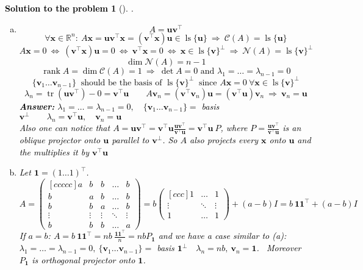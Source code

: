 \documentclass[12pt,a4]{article}
\newtheorem{solution}{Solution to the problem}
\newcommand\rank{\operatorname{rank}}
\newcommand\trace{\operatorname{tr}}
\newcommand\ls{\operatorname{ls}}
\newcommand{\bR}{{\mathbb R}}
\newcommand{\bu}{{\mathbf u}}
\newcommand{\bv}{{\mathbf v}}
\newcommand{\bx}{{\mathbf x}}
\newcommand{\one}{{\mathbf 1}}
\renewcommand{\Im}{{\mathcal C}}
\newcommand{\Ker}{{\mathcal N}}
\newcommand{\answer}[1]{\textbf{Answer:} #1}
\begin{document}
\textcolor{black}{
\begin{solution}[]\rm .
\begin{enumerate}[(a)]
\item
\[
A = \bu \bv^\top
\]
\[
\forall \bx \in \bR^n: ~
A\bx = \bu \bv^\top \bx = (\bv^\top \bx) \bu \in \ls \{\bu\} 
~ \Rightarrow ~
\Im(A) = \ls \{\bu\} 
\]
\[
A\bx = 0
~ \Leftrightarrow ~
(\bv^\top \bx) \bu = 0
~ \Leftrightarrow ~
\bv^\top \bx = 0 
~ \Leftrightarrow ~
\bx \in \ls\{\bv\}^\perp
~ \Rightarrow ~
\Ker(A) = \ls\{\bv\}^\perp
\]
\[
\dim \Ker(A) = n - 1 
\]
\[
\rank A = \dim \Im(A) = 1
~ \Rightarrow ~
\det A = 0
\text{ and }
\lambda_1 = \dots = \lambda_{n-1} = 0
\]
\[
\{\bv_1 \dots \bv_{n-1}\} ~\text{ should be the basis of } \ls\{\bv\}^\perp ~\text{ since } A\bx = 0 ~\forall \bx \in \ls\{\bv\}^\perp
\]
\[
\lambda_n = \trace (\bu\bv^\top) - 0 = \bv^\top\bu
\qquad
A \bv_n = (\bv^\top \bv_n) \bu = (\bv^\top\bu) \bv_n
~ \Rightarrow ~
\bv_n = \bu
\]
\answer{$
\lambda_1 = \dots = \lambda_{n-1} = 0,
\quad
\{\bv_1 \dots \bv_{n-1}\} =$ basis $\bv^\perp
\qquad
\lambda_n = \bv^\top\bu,
\quad
\bv_n = \bu
$}\\[5pt]
Also one can notice that $A = \bu\bv^\top = \bv^\top\bu \frac{\bu\bv^\top}{\bv^\top\bu} = \bv^\top\bu ~P $, where $P = \frac{\bu\bv^\top}{\bv^\top\bu}$ is an oblique projector onto $\bu$ parallel to $\bv^\perp$. So $A$ also projects every $\bx$ onto $\bu$ and the multiplies it by $\bv^\top\bu$
\\
	\item Let $\one = (1 \dots 1)^\top$.
\[
A = 
\begin{pmatrix}[ccccc]
a & b & b & \dots & b\\
b & a & b & \dots & b \\
b & b & a & \dots & b \\
\vdots & \vdots & \vdots & \ddots & \vdots \\
b & b & b & \dots & a
\end{pmatrix}
=
b
\begin{pmatrix}[ccc]
1 & \dots & 1\\
\vdots & \ddots & \vdots \\
1 & \dots & 1
\end{pmatrix}
+
(a-b) I
=
b ~\one \one^\top + (a-b) I
\]
If $a=b$: $ A = b ~\one \one^\top = nb ~\frac{\one \one^\top}n = nb P_{\one}$ and we have a case similar to (a):
$\lambda_1 = \dots = \lambda_{n-1} = 0, ~
\{\bv_1 \dots \bv_{n-1}\} =$ basis $\one^\perp
\quad
\lambda_n = nb,~
\bv_n = \one
$.~
Moreover $P_{\one}$ is orthogonal projector onto $\one$.\\

\end{enumerate}
\end{solution}}
\end{document}
